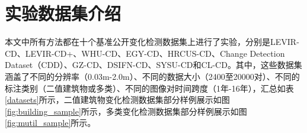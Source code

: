 \documentclass[lang=chs, degree=master, blindreview=false, adobe=false]{yanputhesis}
\begin{document}
\section{实验数据集介绍}
本文中所有方法都在十个基准公开变化检测数据集上进行了实验，分别是LEVIR-CD\cite{chen2020levircd}、LEVIR-CD+\cite{chen2020levircd}、WHU-CD\cite{ji2018whu}、EGY-CD\cite{holail2023EGYCD}、HRCUS-CD\cite{zhang2023HRCUS}、Change Detection Dataset（CDD）\cite{Lebedev2018CDD}、GZ-CD\cite{peng2021SemiCDNet}、DSIFN-CD\cite{zhang2020dsifn}、SYSU-CD\cite{shi2022SYSU}和CL-CD\cite{liu2022CLCD}。其中，这些数据集涵盖了不同的分辨率（0.03m-2.0m）、不同的数据大小（2400至20000对）、不同的标注类别（二值建筑物或多类）、不同的图像对时间跨度（1年-16年），汇总如表\ref{datasets}所示，二值建筑物变化检测数据集部分样例展示如图\ref{fig:building_sample}所示，多类变化检测数据集部分样例展示如图\ref{fig:mutil_sample}所示。
\end{document}
